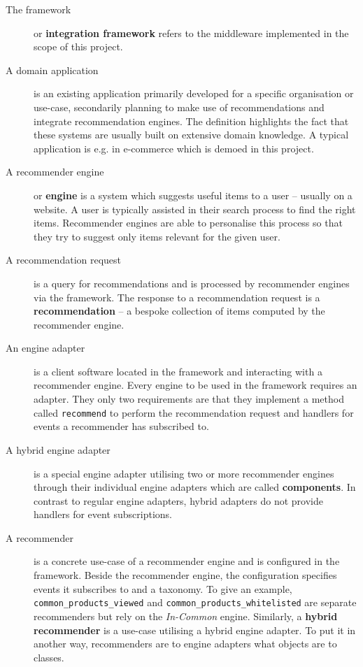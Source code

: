 \begin{description}

\item[\textnormal{The} framework] or \textbf{integration framework} refers to the middleware implemented in the scope of this project.

\item[\textnormal{A} domain application] is an existing application primarily developed for a specific organisation or use-case, secondarily planning to make use of recommendations and integrate recommendation engines. The definition highlights the fact that these systems are usually built on extensive domain knowledge. A typical application is e.g. in e-commerce which is demoed in this project.

\item[\textnormal{A} recommender engine] or \textbf{engine} is a system which suggests useful items to a user -- usually on a website. A user is typically assisted in their search process to find the right items. Recommender engines are able to personalise this process so that they try to suggest only items relevant for the given user.

\item[\textnormal{A} recommendation request] is a query for recommendations and is processed by recommender engines via the framework. The response to a recommendation request is a \textbf{recommendation} -- a bespoke collection of items computed by the recommender engine.

\item[\textnormal{An} engine adapter] is a client software located in the framework and interacting with a recommender engine. Every engine to be used in the framework requires an adapter. They only two requirements are that they implement a method called \texttt{recommend} to perform the recommendation request and handlers for events a recommender has subscribed to.

\item[\textnormal{A} hybrid engine adapter] is a special engine adapter utilising two or more recommender engines through their individual engine adapters which are called \textbf{components}. In contrast to regular engine adapters, hybrid adapters do not provide handlers for event subscriptions.

\item[\textnormal{A} recommender] is a concrete use-case of a recommender engine and is configured in the framework. Beside the recommender engine, the configuration specifies events it subscribes to and a taxonomy. To give an example, \texttt{common_products_viewed} and \texttt{common_products_whitelisted} are separate recommenders but rely on the \emph{In-Common} engine. Similarly, a \textbf{hybrid recommender} is a use-case utilising a hybrid engine adapter. To put it in another way, recommenders are to engine adapters what objects are to classes.


\end{description}
